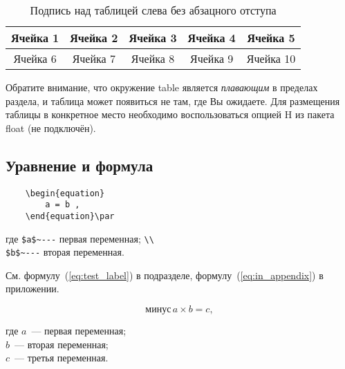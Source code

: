 \documentclass[14pt, a4paper, titlepage]{extarticle}
\begin{document}
\begin{table}[htb]
	\caption{Подпись над таблицей слева без абзацного отступа}
	\centering
	\begin{tabular}{ |c|c|c|c|c| } 
		\hline
		Ячейка 1 & Ячейка 2 & Ячейка 3 & Ячейка 4 & Ячейка 5 \\ \hline
		Ячейка 6 & Ячейка 7 & Ячейка 8 & Ячейка 9 & Ячейка 10 \\ \hline
	\end{tabular}
	\label{tab:test_label}
\end{table}

Обратите внимание, что окружение table является \emph{плавающим} в пределах раздела, и таблица может появиться не там, где Вы ожидаете. Для размещения таблицы в конкретное место необходимо воспользоваться опцией H из пакета float (не подключён).

\subsection{Уравнение и формула}

\begin{verbatim}
	\begin{equation}
		a = b ,
	\end{equation}\par
\end{verbatim}\vspace{-.5cm}
{где \verb"$a$~---" первая переменная; \verb"\\" \\
	\verb"$b$~---" вторая переменная.}\bigskip

См. формулу~(\ref{eq:test_label}) в подразделе, формулу~(\ref{eq:in_appendix}) в приложении.

\begin{equation}\label{eq:test_label}
	\text{минус}\,a\times b=c ,
\end{equation}

где $a$~--- первая переменная; \\
$b$~--- вторая переменная; \\
$c$~--- третья переменная.

\end{document}
